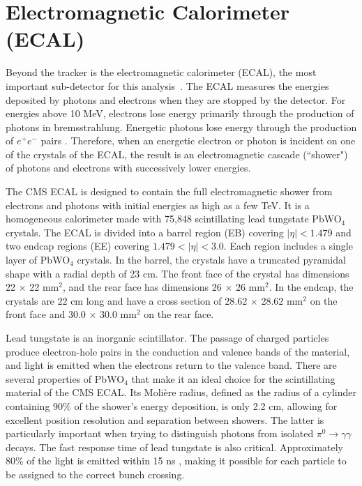 

\section{Electromagnetic Calorimeter (ECAL)}
\label{sec:ECAL}

Beyond the tracker is the electromagnetic calorimeter (ECAL), the most important sub-detector for this analysis~\cite{ECAL_TDR,ECAL_TDRAddendum}. The ECAL measures the energies deposited by photons and electrons when they are stopped by the detector. For energies above 10 MeV, electrons lose energy primarily through the production of photons in bremsstrahlung. Energetic photons lose energy through the production of $e^+e^-$ pairs \cite{Calo}. Therefore, when an energetic electron or photon is incident on one of the crystals of the ECAL, the result is an electromagnetic cascade (``shower") of photons and electrons with successively lower energies.

The CMS ECAL is designed to contain the full electromagnetic shower from electrons and photons with initial energies as high as a few TeV. It is a homogeneous calorimeter made with 75,848 scintillating lead tungstate PbWO$_4$ crystals. The ECAL is divided into a barrel region (EB) covering $|\eta| < 1.479$ and two endcap regions (EE) covering $1.479 < |\eta| < 3.0$.  Each region includes a single layer of PbWO$_4$ crystals. In the barrel, the crystals have a truncated pyramidal shape with a radial depth of 23 cm. The front face of the crystal has dimensions 22 $\times$ 22 mm$^2$, and the rear face has dimensions 26 $\times$ 26 mm$^2$. In the endcap, the crystals are 22 cm long and have a cross section of 28.62 $\times$ 28.62 mm$^2$ on the front face and 30.0 $\times$ 30.0 mm$^2$ on the rear face. 

Lead tungstate is an inorganic scintillator. The passage of charged particles produce electron-hole pairs in the conduction and valence bands of the material, and light is emitted when the electrons return to the valence band. There are several properties of PbWO$_4$ that make it an ideal choice for the scintillating material of the CMS ECAL. Its Moli\`{e}re radius, defined as the radius of a cylinder containing 90\% of the shower's energy deposition, is only 2.2 cm, allowing for excellent position resolution and separation between showers. The latter is particularly important when trying to distinguish photons from isolated $\pi^0\rightarrow\gamma\gamma$ decays. The fast response time of lead tungstate is also critical. Approximately 80\% of the light is emitted within 15 ns \cite{Calo}, making it possible for each particle to be assigned to the correct bunch crossing. 

